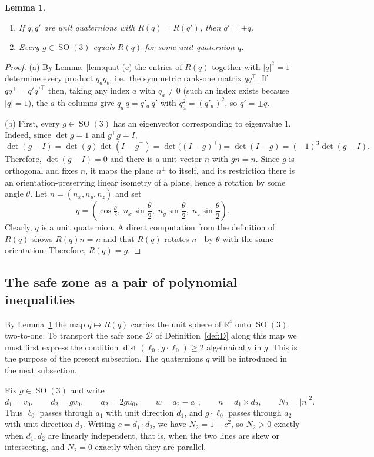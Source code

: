 \documentclass[reqno]{amsart}
\newtheorem{lemma}[theorem]{Lemma}
\theoremstyle{definition}
\DeclareMathOperator{\SO}{SO}
\DeclareMathOperator{\dist}{dist}
\newcommand{\R}{\mathbb{R}}
\newcommand{\Dom}{\mathcal{D}}
\begin{document}
\begin{lemma}\label{lem:cover2}
\leavevmode
\begin{enumerate}[leftmargin=2.2em,label=(\alph*)]
\item If $q,q'$ are unit quaternions with $R(q)=R(q')$, then $q'=\pm q$.
\item Every $g\in\SO(3)$ equals $R(q)$ for some unit quaternion $q$.
\end{enumerate}
\end{lemma}
\begin{proof} (a) By Lemma~\ref{lem:quat}(c) the entries of $R(q)$ together with $|q|^2=1$ determine every product
$q_aq_b$, i.e.\ the symmetric rank-one matrix $qq^\top$. If $qq^\top=q'q'^\top$ then, taking any
index $a$ with $q_a\ne0$ (such an index exists because $|q|=1$), the $a$-th columns give
$q_a\,q=q'_a\,q'$ with $q_a^2=(q'_a)^2$, so $q'=\pm q$.

\noindent (b) First, every $g\in\SO(3)$ has an eigenvector corresponding to eigenvalue $1$. Indeed, since
$\det g=1$ and $g^\top g=I$,
\[
\det(g-I)=\det(g)\det(I-g^\top)=\det\bigl((I-g)^\top\bigr)=\det(I-g)=(-1)^3\det(g-I).
\]
Therefore, $\det(g-I)=0$ and there is a unit vector $n$ with $gn=n$. Since $g$ is orthogonal and
fixes $n$, it maps the plane $n^\perp$ to itself, and its restriction there is an
orientation-preserving linear isometry of a plane, hence a rotation by some angle $\theta$. Let
$n=(n_x,n_y,n_z)$ and set
\[q=\left(\cos\tfrac\theta2,\;n_x\sin\frac\theta2,\;n_y\sin\frac\theta2,\;n_z\sin\frac\theta2\right).\]
Clearly, $q$ is a unit quaternion. A direct computation from the definition of $R(q)$ shows
$R(q)n=n$ and that $R(q)$ rotates $n^\perp$ by $\theta$ with the same orientation. Therefore,
$R(q)=g$.
\end{proof}

\subsection{The safe zone as a pair of polynomial inequalities}\label{subsec:safezoneQ}

By Lemma~\ref{lem:cover2} the map $q\mapsto R(q)$ carries the unit sphere of $\R^4$ onto
$\SO(3)$, two-to-one. To transport the safe zone $\Dom$ of Definition~\ref{def:D} along this map we
must first express the condition $\dist(\ell_0,g\cdot\ell_0)\ge2$ algebraically in $g$. This is
the purpose of the present subsection. The quaternions $q$ will be introduced in the next subsection.

Fix $g\in\SO(3)$ and write
\[
d_1=v_0,\qquad d_2=gv_0,\qquad a_2=2gu_0,\qquad w=a_2-a_1,
\qquad n=d_1\times d_2,\qquad N_2=|n|^2 .
\]
Thus $\ell_0$ passes through $a_1$ with unit direction $d_1$, and $g\cdot\ell_0$ passes through
$a_2$ with unit direction $d_2$. Writing $c=d_1\cdot d_2$, we have $N_2=1-c^2$, so $N_2>0$ exactly
when $d_1,d_2$ are linearly independent, that is, when the two lines are skew or intersecting, and
$N_2=0$ exactly when they are parallel.
\end{document}
